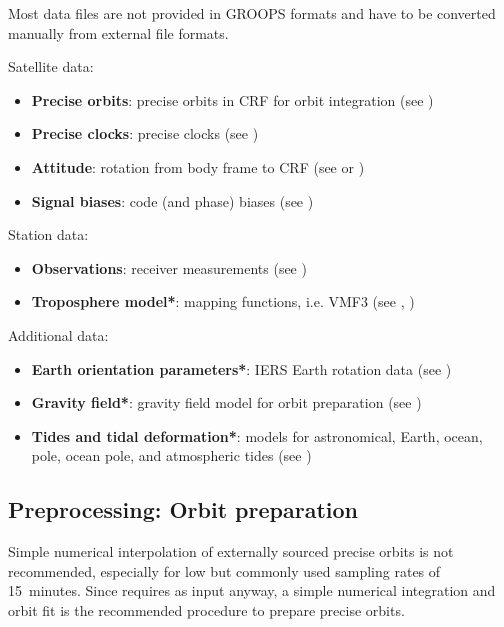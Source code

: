 Most data files are not provided in GROOPS formats and have to be converted manually from external file formats.

Satellite data:
\begin{itemize}
  \item \textbf{Precise orbits}: precise orbits in CRF for orbit integration (see )
  \item \textbf{Precise clocks}: precise clocks (see )
  \item \textbf{Attitude}: rotation from body frame to CRF (see  or )
  \item \textbf{Signal biases}: code (and phase) biases (see )
\end{itemize}

Station data:
\begin{itemize}
  \item \textbf{Observations}: receiver measurements (see )
  \item \textbf{Troposphere model}\textbf{*}: mapping functions, i.e. VMF3 (see ,
        )
\end{itemize}

Additional data:
\begin{itemize}
  \item \textbf{Earth orientation parameters}\textbf{*}: IERS Earth rotation data
        (see )
  \item \textbf{Gravity field}\textbf{*}: gravity field model for orbit preparation
        (see )
  \item \textbf{Tides and tidal deformation}\textbf{*}: models for astronomical, Earth, ocean, pole, ocean pole,
        and atmospheric tides (see )
\end{itemize}

\subsection{Preprocessing: Orbit preparation}\label{cookbook.gnssPpp:orbitPreparation}

Simple numerical interpolation of externally sourced precise orbits is not recommended, especially for low but commonly
used sampling rates of 15~minutes. Since  requires 
as input anyway, a simple numerical integration and orbit fit is the recommended procedure to prepare
precise orbits.

